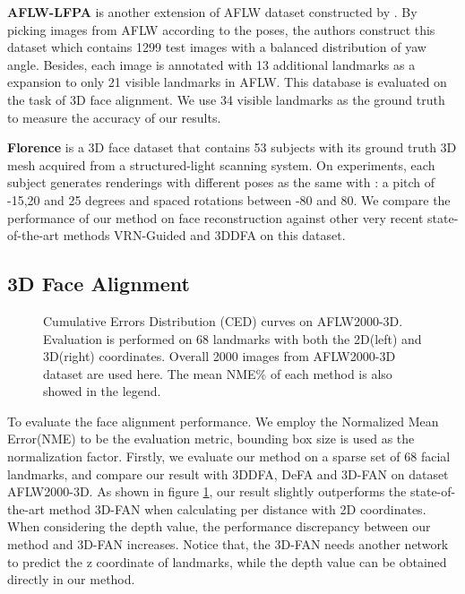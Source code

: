 \documentclass[runningheads]{llncs}
\begin{document}
\textbf{AFLW-LFPA} is another extension of AFLW dataset constructed by \cite{Jourabloo2016Large}. 
By picking images from AFLW according to the poses, the authors construct this dataset which contains 1299 test images with a balanced distribution of yaw angle. 
Besides, each image is annotated with 13 additional landmarks as a expansion to only 21 visible landmarks in AFLW.
This database is evaluated on the task of 3D face alignment. We use 34 visible landmarks as the ground truth to measure the accuracy of our results.

\textbf{Florence}
is a 3D face dataset that contains 53 subjects with its ground truth 3D mesh acquired from a structured-light scanning system\cite{bagdanov2011florence}. On experiments, each subject generates renderings with different poses as the same with \cite{Jackson2017Large}: a pitch of -15,20 and 25 degrees and spaced rotations between -80 and 80. We compare the performance of our method on face reconstruction against other very recent state-of-the-art methods VRN-Guided\cite{Jackson2017Large} and 3DDFA\cite{zhu2016face} on this dataset.


\subsection{3D Face Alignment}
\label{sec: alignment}
\begin{figure}
\vspace{-3mm}
  \centering
  \caption{Cumulative Errors Distribution (CED)
curves on AFLW2000-3D. Evaluation is performed on 68 landmarks with both the 2D(left) and 3D(right) coordinates. Overall 2000 images from AFLW2000-3D dataset are used here. The mean NME\%  of each method is also showed in the legend.}
  \label{fig:aflw2000 68} 
\vspace{-3mm}
\end{figure}

To evaluate the face alignment performance. We employ the Normalized Mean Error(NME) to be the evaluation metric, bounding box size is used as the normalization factor.
Firstly, we evaluate our method on a sparse set of 68 facial landmarks, and compare our result with 3DDFA\cite{zhu2016face}, DeFA\cite{liu2017dense} and 3D-FAN\cite{Bulat2017How} on dataset AFLW2000-3D.  
As shown in figure \ref{fig:aflw2000 68}, 
our result slightly outperforms the state-of-the-art method 3D-FAN when calculating per distance with 2D coordinates. When considering the depth value, 
the performance discrepancy between our method and 3D-FAN increases. 
Notice that, the 3D-FAN needs another network to predict the z coordinate of landmarks, while the depth value can be obtained directly in our method.
\end{document}
